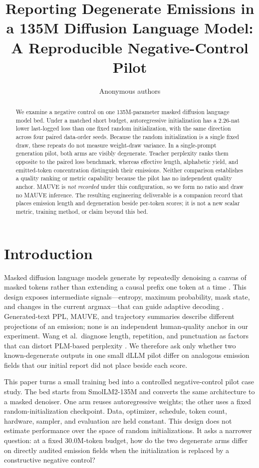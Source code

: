 \documentclass{article}
\title{Reporting Degenerate Emissions in a 135M Diffusion Language Model:\\
A Reproducible Negative-Control Pilot}
\author{Anonymous authors}
\begin{document}
\maketitle

\begin{abstract}
We examine a negative control on one 135M-parameter masked diffusion language
model bed.  Under a matched short budget, autoregressive initialization has a
2.26-nat lower last-logged loss than one fixed random initialization, with the
same direction across four paired data-order seeds.  Because the random
initialization is a single fixed draw, these repeats do not measure
weight-draw variance.  In a single-prompt generation pilot, both arms are
visibly degenerate.  Teacher perplexity ranks them opposite to the paired loss
benchmark, whereas effective length, alphabetic yield, and emitted-token
concentration distinguish their emissions.  Neither comparison establishes a
quality ranking or metric capability because the pilot has no independent
quality anchor.  MAUVE is \emph{not recorded} under this configuration, so we
form no ratio and draw no MAUVE inference.  The resulting engineering
deliverable is a companion record that places emission length and degeneration
beside per-token scores; it is not a new scalar metric, training method, or
claim beyond this bed.
\end{abstract}

\section{Introduction}
\label{sec:introduction}

Masked diffusion language models generate by repeatedly denoising a canvas of
masked tokens rather than extending a causal prefix one token at a time
\citep{sahoo2024mdlm,nie2025llada}.  This design exposes intermediate
signals---entropy, maximum probability, mask state, and changes in the current
argmax---that can guide adaptive decoding \citep{li2025daedal}.  Generated-text
PPL, MAUVE, and trajectory summaries describe different projections of an
emission; none is an independent human-quality anchor in our experiment.
Wang et al.\ diagnose length, repetition, and punctuation as factors that can
distort PLM-based perplexity \citep{wang2022ppl}.  We therefore ask only whether
two known-degenerate outputs in one small dLLM pilot differ on analogous
emission fields that our initial report did not place beside each score.

This paper turns a small training bed into a controlled negative-control pilot
case study.  The bed starts from SmolLM2-135M \citep{allal2025smollm2} and converts
the same architecture to a masked denoiser.  One arm reuses autoregressive
weights; the other uses a fixed random-initialization checkpoint.  Data,
optimizer, schedule, token count, hardware, sampler, and evaluation are held
constant.  This design does not estimate performance over the space of random
initializations.  It asks a narrower question: at a fixed 30.0M-token budget,
how do the two degenerate arms differ on directly audited emission fields when
the initialization is replaced by a constructive negative control?
\end{document}
